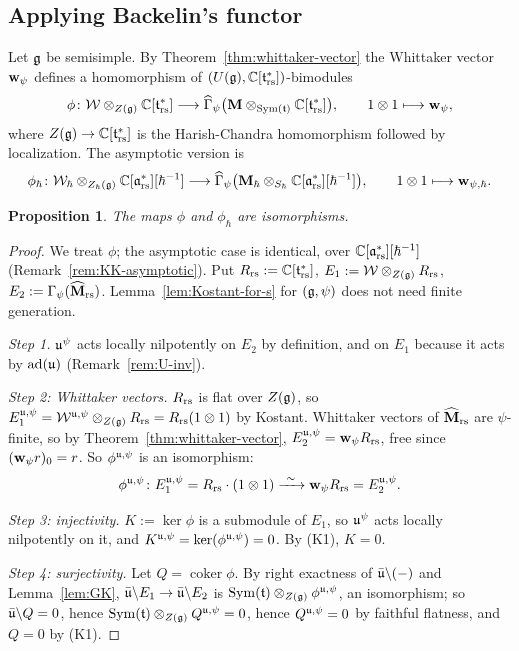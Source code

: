 \documentclass{article}
\theoremstyle{plain}
\newtheorem{proposition}[theorem]{Proposition}
\theoremstyle{definition}
\theoremstyle{remark}
\numberwithin{equation}{section}
\begin{document}
\subsection{Applying Backelin's functor}\label{sec:apply-backelin}
Let $\mathfrak{g}$ be semisimple. By Theorem~\ref{thm:whittaker-vector} the Whittaker vector $\mathbf w_\psi$ defines a homomorphism of $(U(\mathfrak{g}),\mathbb{C}[\mathfrak{t}^*_{\mathrm{rs}}])$-bimodules
\begin{equation}\label{eq:phi}
\phi\colon\mathcal{W}\otimes_{Z(\mathfrak{g})}\mathbb{C}[\mathfrak{t}^*_{\mathrm{rs}}]\longrightarrow\widehat\Gamma_\psi\bigl(\mathbf{M}\otimes_{\operatorname{Sym}(\mathfrak{t})}\mathbb{C}[\mathfrak{t}^*_{\mathrm{rs}}]\bigr),\qquad 1\otimes1\longmapsto \mathbf w_\psi ,
\end{equation}
where $Z(\mathfrak{g})\to\mathbb{C}[\mathfrak{t}^*_{\mathrm{rs}}]$ is the Harish-Chandra homomorphism followed by localization. The asymptotic version is
\begin{equation}\label{eq:phi-h}
\phi_\hbar\colon\mathcal{W}_\hbar\otimes_{Z_\hbar(\mathfrak{g})}\mathbb{C}[\mathfrak{a}^*_{\mathrm{rs}}][\hbar^{-1}]\longrightarrow\widehat\Gamma_\psi\bigl(\mathbf{M}_\hbar\otimes_{S_\hbar}\mathbb{C}[\mathfrak{a}^*_{\mathrm{rs}}][\hbar^{-1}]\bigr),\qquad 1\otimes1\longmapsto \mathbf w_{\psi,\hbar}.
\end{equation}

\begin{proposition}\label{prop:phi-iso}
The maps $\phi$ and $\phi_\hbar$ are isomorphisms.
\end{proposition}

\begin{proof}
We treat $\phi$; the asymptotic case is identical, over $\mathbb{C}[\mathfrak{a}^*_{\mathrm{rs}}][\hbar^{-1}]$ (Remark~\ref{rem:KK-asymptotic}). Put $R_{\mathrm{rs}}:=\mathbb{C}[\mathfrak{t}^*_{\mathrm{rs}}]$, $E_1:=\mathcal{W}\otimes_{Z(\mathfrak{g})}R_{\mathrm{rs}}$, $E_2:=\Gamma_\psi(\widehat{\mathbf{M}}_{\mathrm{rs}})$. Lemma~\ref{lem:Kostant-for-s} for $(\mathfrak{g},\psi)$ does not need finite generation.

\emph{Step 1.} $\mathfrak{u}^\psi$ acts locally nilpotently on $E_2$ by definition, and on $E_1$ because it acts by $\operatorname{ad}(\mathfrak{u})$ (Remark~\ref{rem:U-inv}).

\emph{Step 2: Whittaker vectors.} $R_{\mathrm{rs}}$ is flat over $Z(\mathfrak{g})$, so $E_1^{\mathfrak{u},\psi}=\mathcal{W}^{\mathfrak{u},\psi}\otimes_{Z(\mathfrak{g})}R_{\mathrm{rs}}=R_{\mathrm{rs}}(1\otimes1)$ by Kostant. Whittaker vectors of $\widehat{\mathbf{M}}_{\mathrm{rs}}$ are $\psi$-finite, so by Theorem~\ref{thm:whittaker-vector}, $E_2^{\mathfrak{u},\psi}=\mathbf w_\psi R_{\mathrm{rs}}$, free since $(\mathbf w_\psi r)_0=r$. So $\phi^{\mathfrak{u},\psi}$ is an isomorphism:
\[
\phi^{\mathfrak{u},\psi}\colon E_1^{\mathfrak{u},\psi}=R_{\mathrm{rs}}\cdot(1\otimes 1)\xrightarrow{\ \sim\ }\mathbf w_\psi R_{\mathrm{rs}}=E_2^{\mathfrak{u},\psi}.
\]

\emph{Step 3: injectivity.} $K:=\ker\phi$ is a submodule of $E_1$, so $\mathfrak{u}^\psi$ acts locally nilpotently on it, and $K^{\mathfrak{u},\psi}=\ker(\phi^{\mathfrak{u},\psi})=0$. By (K1), $K=0$.

\emph{Step 4: surjectivity.} Let $Q=\operatorname{coker}\phi$. By right exactness of $\bar{\mathfrak{u}}\backslash(-)$ and Lemma~\ref{lem:GK}, $\bar{\mathfrak{u}}\backslash E_1\to\bar{\mathfrak{u}}\backslash E_2$ is $\operatorname{Sym}(\mathfrak{t})\otimes_{Z(\mathfrak{g})}\phi^{\mathfrak{u},\psi}$, an isomorphism; so $\bar{\mathfrak{u}}\backslash Q=0$, hence $\operatorname{Sym}(\mathfrak{t})\otimes_{Z(\mathfrak{g})}Q^{\mathfrak{u},\psi}=0$, hence $Q^{\mathfrak{u},\psi}=0$ by faithful flatness, and $Q=0$ by (K1).
\end{proof}
\end{document}
